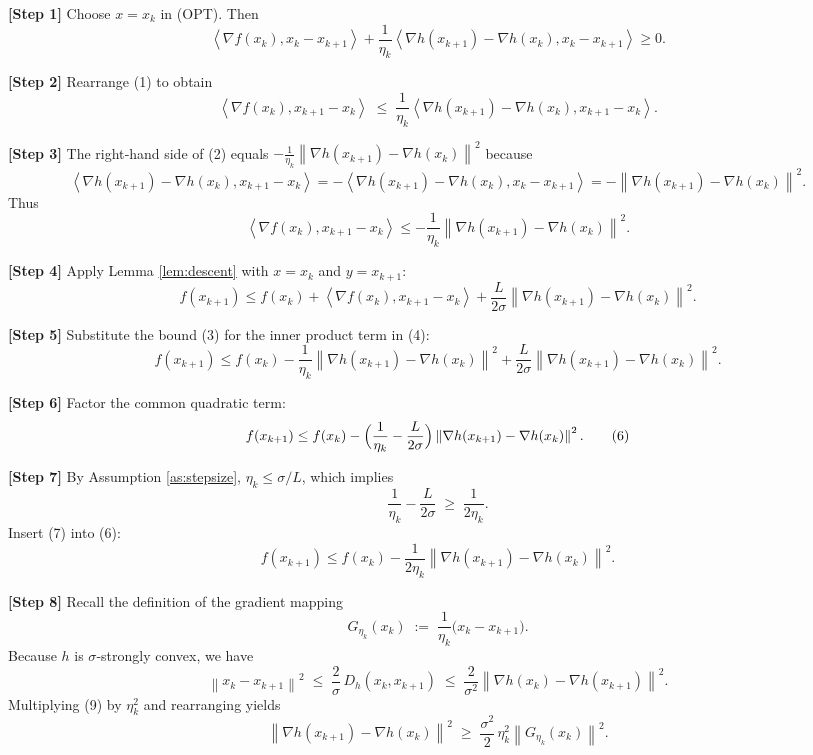 \documentclass[11pt]{article}
\newcommand{\norm}[1]{\left\lVert#1\right\rVert}
\newcommand{\inner}[2]{\left\langle #1,#2\right\rangle}
\newcommand{\D}[2]{D_{h}(#1,#2)}
\begin{document}
\noindent\textbf{[Step 1]} Choose $x=x_{k}$ in (OPT). Then
\[
\inner{\nabla f(x_{k})}{x_{k}-x_{k+1}}+\frac{1}{\eta_{k}}\inner{\nabla h(x_{k+1})-\nabla h(x_{k})}{x_{k}-x_{k+1}}\ge 0.
\tag{1}
\]

\noindent\textbf{[Step 2]} Rearrange (1) to obtain
\[
\inner{\nabla f(x_{k})}{x_{k+1}-x_{k}}
\;\le\;
\frac{1}{\eta_{k}}\inner{\nabla h(x_{k+1})-\nabla h(x_{k})}{x_{k+1}-x_{k}}.
\tag{2}
\]

\noindent\textbf{[Step 3]} The right‑hand side of (2) equals $-\frac{1}{\eta_{k}}\norm{\nabla h(x_{k+1})-\nabla h(x_{k})}^{2}$ because
\[
\inner{\nabla h(x_{k+1})-\nabla h(x_{k})}{x_{k+1}-x_{k}}
= -\inner{\nabla h(x_{k+1})-\nabla h(x_{k})}{x_{k}-x_{k+1}}
= -\norm{\nabla h(x_{k+1})-\nabla h(x_{k})}^{2}.
\]
Thus
\[
\inner{\nabla f(x_{k})}{x_{k+1}-x_{k}} \le -\frac{1}{\eta_{k}}\norm{\nabla h(x_{k+1})-\nabla h(x_{k})}^{2}.
\tag{3}
\]

\noindent\textbf{[Step 4]} Apply Lemma \ref{lem:descent} with $x=x_{k}$ and $y=x_{k+1}$:
\[
f(x_{k+1})\le f(x_{k})+\inner{\nabla f(x_{k})}{x_{k+1}-x_{k}}+\frac{L}{2\sigma}\norm{\nabla h(x_{k+1})-\nabla h(x_{k})}^{2}.
\tag{4}
\]

\noindent\textbf{[Step 5]} Substitute the bound (3) for the inner product term in (4):
\[
f(x_{k+1})\le f(x_{k})-\frac{1}{\eta_{k}}\norm{\nabla h(x_{k+1})-\nabla h(x_{k})}^{2}
+\frac{L}{2\sigma}\norm{\nabla h(x_{k+1})-\nabla h(x_{k})}^{2}.
\tag{5}
\]

\noindent\textbf{[Step 6]} Factor the common quadratic term:
\[
f(x_{k+1})\le f(x_{k})-\Bigl(\frac{1}{\eta_{k}}-\frac{L}{2\sigma}\Bigr)\norm{\nabla h(x_{k+1})-\nabla h(x_{k})}^{2}.
\tag{6}
\]

\noindent\textbf{[Step 7]} By Assumption \ref{as:stepsize}, $\eta_{k}\le \sigma/L$, which implies
\[
\frac{1}{\eta_{k}}-\frac{L}{2\sigma}\;\ge\;\frac{1}{2\eta_{k}}.
\tag{7}
\]
Insert (7) into (6):
\[
f(x_{k+1})\le f(x_{k})-\frac{1}{2\eta_{k}}\norm{\nabla h(x_{k+1})-\nabla h(x_{k})}^{2}.
\tag{8}
\]

\noindent\textbf{[Step 8]} Recall the definition of the gradient mapping
\[
G_{\eta_{k}}(x_{k})\;:=\;\frac{1}{\eta_{k}}\bigl(x_{k}-x_{k+1}\bigr).
\]
Because $h$ is $\sigma$‑strongly convex, we have
\[
\norm{x_{k}-x_{k+1}}^{2}\;\le\;\frac{2}{\sigma}\,\D{x_{k}}{x_{k+1}}
\;\le\;\frac{2}{\sigma^{2}}\norm{\nabla h(x_{k})-\nabla h(x_{k+1})}^{2}.
\tag{9}
\]
Multiplying (9) by $\eta_{k}^{2}$ and rearranging yields
\[
\norm{\nabla h(x_{k+1})-\nabla h(x_{k})}^{2}\;\ge\;\frac{\sigma^{2}}{2}\,\eta_{k}^{2}\norm{G_{\eta_{k}}(x_{k})}^{2}.
\tag{10}
\]
\end{document}
